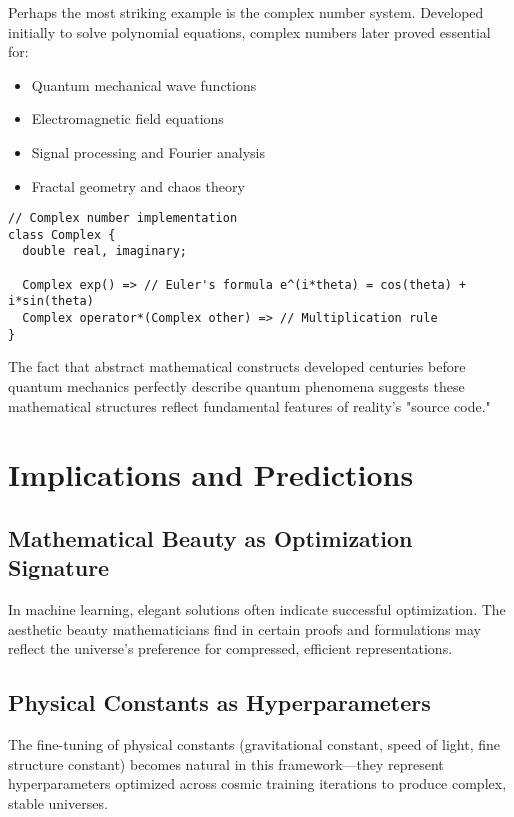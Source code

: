 \documentclass[12pt]{article}
\begin{document}
Perhaps the most striking example is the complex number system. Developed initially to solve polynomial equations, complex numbers later proved essential for:

\begin{itemize}
\item Quantum mechanical wave functions
\item Electromagnetic field equations
\item Signal processing and Fourier analysis
\item Fractal geometry and chaos theory
\end{itemize}

\begin{verbatim}
// Complex number implementation
class Complex {
  double real, imaginary;
  
  Complex exp() => // Euler's formula e^(i*theta) = cos(theta) + i*sin(theta)
  Complex operator*(Complex other) => // Multiplication rule
}
\end{verbatim}

The fact that abstract mathematical constructs developed centuries before quantum mechanics perfectly describe quantum phenomena suggests these mathematical structures reflect fundamental features of reality's "source code."

\section{Implications and Predictions}

\subsection{Mathematical Beauty as Optimization Signature}

In machine learning, elegant solutions often indicate successful optimization. The aesthetic beauty mathematicians find in certain proofs and formulations may reflect the universe's preference for compressed, efficient representations.

\subsection{Physical Constants as Hyperparameters}

The fine-tuning of physical constants (gravitational constant, speed of light, fine structure constant) becomes natural in this framework—they represent hyperparameters optimized across cosmic training iterations to produce complex, stable universes.
\end{document}
